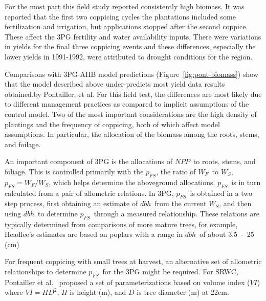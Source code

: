 \documentclass[10pt]{article}
\newcommand{\dbh}{\ensuremath{dbh}}
\newcommand{\NPP}{\ensuremath{NPP}}
\newcommand{\WF}{\ensuremath{W_F}}
\newcommand{\WS}{\ensuremath{W_S}}
\newcommand{\pfs}{\ensuremath{p_{FS}}}
\newcommand{\VI}{\ensuremath{VI}}
\begin{document}
For the most part this field study reported consistently high biomass. It was
reported that the first two coppicing cycles the plantations included some
fertilization and irrigation, but applications stopped after the second
coppice. These affect the 3PG fertility and water availability inputs.  There
were variations in yields for the final three coppicing events and these
differences, especially the lower yields in 1991-1992, were attributed to
drought conditions for the region.

Comparisons with 3PG-AHB model predictions (Figure~\ref{fig:pont-biomass}) show
that the model described above under-predicts most yield data results
obtained.by Pontailler, et al.  For this field test, the differences are most
likely due to different management practices as compared to implicit assumptions
of the control model. Two of the most important considerations are the high
density of plantings and the frequency of coppicing, both of which affect model
assumptions.  In particular, the allocation of the biomass among the roots,
stems, and foilage.

An important component of 3PG is the allocations of \NPP~to roots, stems, and
foliage.  This is controlled primarily with the \pfs, the ratio of \WF~to \WS,
$\pfs=\WF/\WS$, which helps determine the aboveground allocations.  \pfs~is in
turn calculated from a pair of allometric relations.  In 3PG, \pfs~is obtained
in a two step process, first obtaining an estimate of \dbh~from the current \WS,
and then using \dbh~to determine \pfs~through a measured relationship.  These
relations are typically determined from comparisons of more mature trees, for
example, Headlee's estimates are based on poplars with a range in \dbh~of about
3.5~-~25 (cm)~\cite{Headlee2012}%

For frequent coppicing with small trees at harvest, an alternative set of
allometric relationships to determine \pfs~for the 3PG might be required. For
SRWC, Pontailler et al.~\cite{pontailler97-volume-index} proposed a set of
parameterizations based on volume index (\VI) where $VI = HD^2$, $H$ is height
(m), and $D$ is tree diameter (m) at 22cm.
\end{document}

